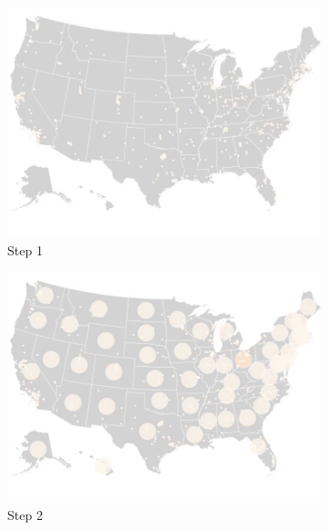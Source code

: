 \begin{figure}[!htb]
    \centering

    \begin{subfigure}[b]{0.31\textwidth}
        \centering
        \includegraphics[width=\textwidth]{images/results/dot_cartogram/transition_1.png}
        \caption[]%
        {{\small Step 1}}
    \end{subfigure}
    \hfill
    \begin{subfigure}[b]{0.31\textwidth}
        \centering
        \includegraphics[width=\textwidth]{images/results/dot_cartogram/transition_2.png}
        \caption[]%
        {{\small Step 2}}
    \end{subfigure}
    \hfill
    \begin{subfigure}[b]{0.31\textwidth}

\end{subfigure}
\end{figure}
